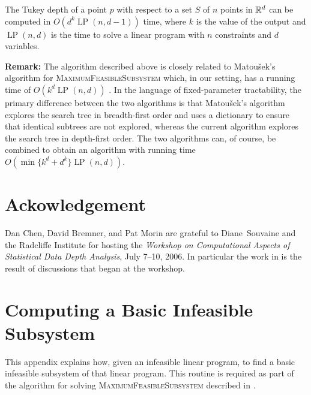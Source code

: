 \documentclass[12pt]{article}
\DeclareMathOperator{\lp}{LP}
\begin{document}
\begin{thm}
The Tukey depth of a point $p$ with respect to a set $S$ of $n$ points
in $\mathbb{R}^d$ can be computed in $O(d^k\lp(n,d-1))$ time, where $k$ is
the value of the output and $\lp(n,d)$ is the time to solve a linear
program with $n$ constraints and $d$ variables.
\end{thm}

\noindent\textbf{Remark:}
The algorithm described above is closely related to Matou\v{s}ek's
algorithm for \textsc{MaximumFeasibleSubsystem} which, in our setting, 
has a running
time of $O(k^{d}\lp(n,d))$ \cite{m95}.  In the language of fixed-parameter
tractability, the primary difference between the two algorithms is
that Matou\v{s}ek's algorithm explores the search tree in
breadth-first order and uses a dictionary to ensure that identical
subtrees are not explored, whereas the current algorithm explores the
search tree in depth-first order.  The two algorithms can, of course,
be combined to obtain an algorithm with running time $O(\min\{k^d +
d^k\}\lp(n,d))$.


\section*{Ackowledgement}

Dan Chen, David Bremner, and Pat Morin are grateful to Diane~Souvaine
and the Radcliffe Institute for hosting the \emph{Workshop on
Computational Aspects of Statistical Data Depth Analysis}, July 7--10,
2006.  In particular the work in  is the result of
discussions that began at the workshop.




\appendix
\section{Computing a Basic Infeasible Subsystem}

This appendix explains how, given an infeasible linear program, to
find a basic infeasible subsystem of that linear program.  This
routine is required as part of the algorithm for solving
\textsc{MaximumFeasibleSubsystem} described in .
\end{document}
